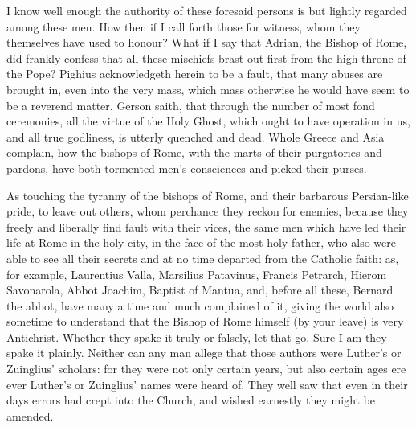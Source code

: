 I know well enough the authority of these foresaid persons is but
lightly regarded among these men. How then if I call forth those
for witness, whom they themselves have used to honour? What if
I say that Adrian, the Bishop of Rome, did
frankly confess that all these mischiefs brast out first from the high
throne of the Pope? Pighius acknowledgeth herein to be a fault,
that many abuses are brought in, even into the very mass, which mass
otherwise he would have seem to be a reverend matter. Gerson saith,
that through the number of most fond ceremonies, all the virtue of the
Holy Ghost, which ought to have operation in us, and all true godliness,
is utterly quenched and dead. Whole Greece and Asia complain,
how the bishops of Rome, with the marts of their purgatories and pardons,
have both tormented men’s consciences and picked their purses.

As touching the tyranny of the bishops of Rome, and their barbarous
Persian-like pride, to leave out others, whom perchance they reckon
for enemies, because they freely and liberally find fault with their
vices, the same men which have led their life at Rome in the holy city,
in the face of the most holy father, who also were able to see all their
secrets and at no time departed from the Catholic faith: as, for example,
Laurentius Valla, Marsilius Patavinus, Francis Petrarch, Hierom Savonarola,
Abbot Joachim, Baptist of Mantua, and, before all these, Bernard the
abbot, have many a time and much complained of it, giving the
world also sometime to understand that the Bishop of Rome himself (by
your leave) is very Antichrist. Whether they spake it truly or
falsely, let that go. Sure I am they spake it plainly. Neither
can any man allege that those authors were Luther’s or Zuinglius’
scholars: for they were not only certain years, but also certain ages
ere ever Luther’s or Zuinglius’ names were heard of.
They well saw that even in their days errors had crept into the Church,
and wished earnestly they might be amended.

